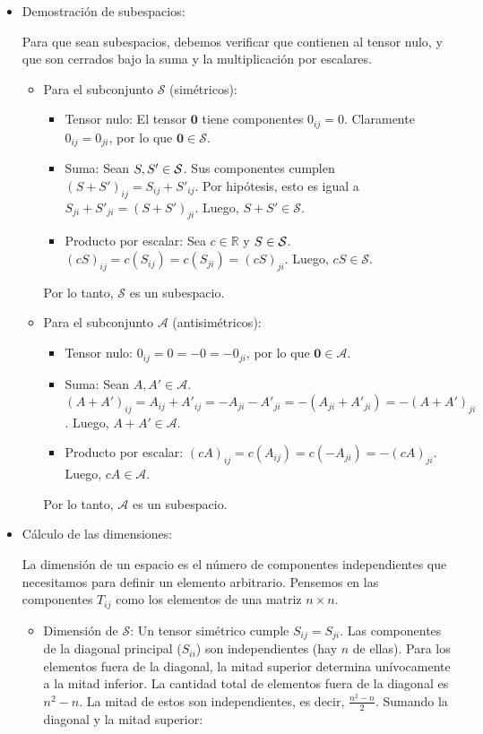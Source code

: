 \documentclass[11pt,spanish]{article}
\begin{document}
\begin{itemize}
\item[a)] Demostración de subespacios:

Para que sean subespacios, debemos verificar que contienen al tensor nulo, y que son cerrados bajo la suma y la multiplicación por escalares.

\begin{itemize}
\item Para el subconjunto $\mathcal{S}$ (simétricos):
\begin{itemize}
\item Tensor nulo: El tensor $\mathbf{0}$ tiene componentes $0_{ij} = 0$. Claramente $0_{ij} = 0_{ji}$, por lo que $\mathbf{0} \in \mathcal{S}$.
\item Suma: Sean $S, S' \in \cal{S}$. Sus componentes cumplen $(S+S')_{ij} = S_{ij} + S'_{ij}$. Por hipótesis, esto es igual a $S_{ji} + S'_{ji} = (S+S')_{ji}$. Luego, $S+S' \in \mathcal{S}$.
\item Producto por escalar: Sea $c \in \mathbb{R}$ y $S \in \cal{S}$. $(cS)_{ij} = c(S_{ij}) = c(S_{ji}) = (cS)_{ji}$. Luego, $cS \in \mathcal{S}$.
\end{itemize}
Por lo tanto, $\mathcal{S}$ es un subespacio.

\item Para el subconjunto $\mathcal{A}$ (antisimétricos):
\begin{itemize}
\item Tensor nulo: $0_{ij} = 0 = -0 = -0_{ji}$, por lo que $\mathbf{0} \in \mathcal{A}$.
\item Suma: Sean $A, A' \in \mathcal{A}$. $(A+A')_{ij} = A_{ij} + A'_{ij} = -A_{ji} - A'_{ji} = -(A_{ji} + A'_{ji}) = -(A+A')_{ji}$. Luego, $A+A' \in \mathcal{A}$.
\item Producto por escalar: $(cA)_{ij} = c(A_{ij}) = c(-A_{ji}) = -(cA)_{ji}$. Luego, $cA \in \mathcal{A}$.
\end{itemize}
Por lo tanto, $\mathcal{A}$ es un subespacio.
\end{itemize}

\item[b)] Cálculo de las dimensiones:

La dimensión de un espacio es el número de componentes independientes que necesitamos para definir un elemento arbitrario. Pensemos en las componentes $T_{ij}$ como los elementos de una matriz $n \times n$.

\begin{itemize}
\item Dimensión de $\mathcal{S}$:
Un tensor simétrico cumple $S_{ij} = S_{ji}$. Las componentes de la diagonal principal ($S_{ii}$) son independientes (hay $n$ de ellas). Para los elementos fuera de la diagonal, la mitad superior determina unívocamente a la mitad inferior.
La cantidad total de elementos fuera de la diagonal es $n^2 - n$. La mitad de estos son independientes, es decir, $\frac{n^2-n}{2}$.
Sumando la diagonal y la mitad superior:


\end{itemize}
\end{itemize}
\end{document}
